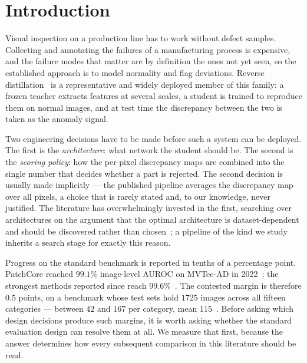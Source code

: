 %

\section{Introduction}
\label{sec:introduction}

Visual inspection on a production line has to work without defect samples.
Collecting and annotating the failures of a manufacturing process is expensive,
and the failure modes that matter are by definition the ones not yet seen, so the
established approach is to model normality and flag deviations. Reverse
distillation~\cite{deng2022reverse} is a representative and widely deployed member
of this family: a frozen teacher extracts features at several scales, a student is
trained to reproduce them on normal images, and at test time the discrepancy
between the two is taken as the anomaly signal.

Two engineering decisions have to be made before such a system can be deployed.
The first is the \emph{architecture}: what network the student should be. The
second is the \emph{scoring policy}: how the per-pixel discrepancy maps are
combined into the single number that decides whether a part is rejected. The
second decision is usually made implicitly --- the published pipeline averages the
discrepancy map over all pixels, a choice that is rarely stated and, to our
knowledge, never justified. The literature has overwhelmingly invested in the
first, searching over architectures on the argument that the optimal
architecture is dataset-dependent and should be discovered rather than
chosen~\cite{qian2024knowledgeguided,xie2017genetic}; a pipeline of the kind we
study inherits a search stage for exactly this reason.

 Progress on the standard benchmark is reported in tenths of a
percentage point. PatchCore reached $99.1\%$ image-level AUROC on MVTec-AD in
2022~\cite{roth2022patchcore}; the strongest methods reported since reach
$99.6\%$~\cite{liu2023simplenet,guo2025dinomaly}. The contested margin is
therefore $0.5$ points, on a benchmark whose test sets hold $1725$ images across
all fifteen categories --- between $42$ and $167$ per category, mean
$115$~\cite{bergmann2021mvtec}. Before asking which design decisions produce such
margins,
it is worth asking whether the standard evaluation design can resolve them at all.
We measure that first, because the answer determines how every subsequent
comparison in this literature should be read.

